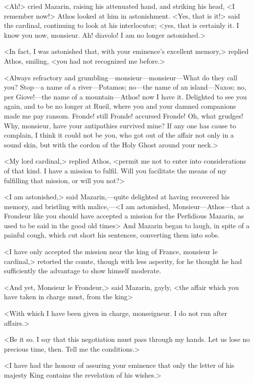 <Ah!> cried Mazarin, raising his attenuated hand, and striking his head, <I remember now!> Athos looked at him in astonishment. <Yes, that is it!> said the cardinal, continuing to look at his interlocutor; <yes, that is certainly it. I know you now, monsieur. Ah! diavolo! I am no longer astonished.>

<In fact, I was astonished that, with your eminence's excellent memory,> replied Athos, smiling, <you had not recognized me before.>

<Always refractory and grumbling—monsieur—monsieur—What do they call you? Stop—a name of a river—Potamos; no—the name of an island—Naxos; no, per Giove!—the name of a mountain—Athos! now I have it. Delighted to see you again, and to be no longer at Rueil, where you and your damned companions made me pay ransom. Fronde! still Fronde! accursed Fronde! Oh, what grudges! Why, monsieur, have your antipathies survived mine? If any one has cause to complain, I think it could not be you, who got out of the affair not only in a sound skin, but with the cordon of the Holy Ghost around your neck.>

<My lord cardinal,> replied Athos, <permit me not to enter into considerations of that kind. I have a mission to fulfil. Will you facilitate the means of my fulfilling that mission, or will you not?>

<I am astonished,> said Mazarin,—quite delighted at having recovered his memory, and bristling with malice,—<I am astonished, Monsieur—Athos—that a Frondeur like you should have accepted a mission for the Perfidious Mazarin, as used to be said in the good old times\longdash> And Mazarin began to laugh, in spite of a painful cough, which cut short his sentences, converting them into sobs.

<I have only accepted the mission near the king of France, monsieur le cardinal,> retorted the comte, though with less asperity, for he thought he had sufficiently the advantage to show himself moderate.

<And yet, Monsieur le Frondeur,> said Mazarin, gayly, <the affair which you have taken in charge must, from the king\longdash>

<With which I have been given in charge, monseigneur. I do not run after affairs.>

<Be it so. I say that this negotiation must pass through my hands. Let us lose no precious time, then. Tell me the conditions.>

<I have had the honour of assuring your eminence that only the letter of his majesty King  contains the revelation of his wishes.>

